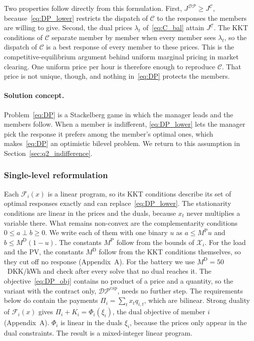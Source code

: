 Two properties follow directly from this formulation.
First, $J^{\mathcal{DP}}\geq J^{\mathcal{C}}$, because~\eqref{eq:DP_lower} restricts the dispatch of $\mathcal{C}$ to the responses the members are willing to give.
Second, the dual prices $\lambda_t$ of~\eqref{eq:C_bal} attain $J^{\mathcal{C}}$.
The KKT conditions of $\mathcal{C}$ separate member by member when every member sees $\lambda_t$, so the dispatch of $\mathcal{C}$ is a best response of every member to these prices.
This is the competitive-equilibrium argument behind uniform marginal pricing in market clearing.
One uniform price per hour is therefore enough to reproduce $\mathcal{C}$.
That price is not unique, though, and nothing in~\eqref{eq:DP} protects the members.

\paragraph{Solution concept.}
Problem~\eqref{eq:DP} is a Stackelberg game in which the manager leads and the members follow.
When a member is indifferent, \eqref{eq:DP_lower} lets the manager pick the response it prefers among the member's optimal ones, which makes~\eqref{eq:DP} an optimistic bilevel problem.
We return to this assumption in Section~\ref{sec:q2_indifference}.

\subsubsection{Single-level reformulation}
Each $\mathcal{F}_i(x)$ is a linear program, so its KKT conditions describe its set of optimal responses exactly and can replace~\eqref{eq:DP_lower}.
The stationarity conditions are linear in the prices and the duals, because $x_t$ never multiplies a variable there.
What remains non-convex are the complementarity conditions $0\leq a\perp b\geq0$.
We write each of them with one binary $u$ as $a\leq M^{\mathrm{P}}u$ and $b\leq M^{\mathrm{D}}(1-u)$.
The constants $M^{\mathrm{P}}$ follow from the bounds of $\mathcal{X}_i$.
For the load and the PV, the constants $M^{\mathrm{D}}$ follow from the KKT conditions themselves, so they cut off no response (Appendix~A).
For the battery we use $M^{\mathrm{D}}=50$~DKK/kWh and check after every solve that no dual reaches it.
The objective~\eqref{eq:DP_obj} contains no product of a price and a quantity, so the variant with the contract only, $\mathcal{DP}^{\mathrm{cap}}$, needs no further step.
The requirements below do contain the payments $\Pi_i=\sum_tx_tq_{i,t}$, which are bilinear.
Strong duality of $\mathcal{F}_i(x)$ gives $\Pi_i+K_i=\Phi_i(\xi_i)$, the dual objective of member $i$ (Appendix~A).
$\Phi_i$ is linear in the duals $\xi_i$, because the prices only appear in the dual constraints.
The result is a mixed-integer linear program.

